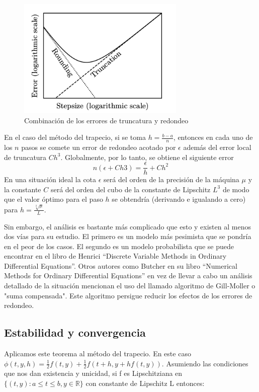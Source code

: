\documentclass{article}
\theoremstyle{theorem-style}  %
\theoremstyle{definition-style}
\theoremstyle{example-style}
\begin{document}
		\begin{figure}[H]
			\centering
			\includegraphics[width=8cm]{./Images/redondeo.png}
			\caption{Combinación de los errores de truncatura y redondeo} 
			\label{fig:redondeo}
		\end{figure}
		
		En el caso del método del trapecio, si se toma $h=\frac{b-a}{n}$, entonces en cada uno de los $n$ pasos se comete un error de redondeo acotado por $\epsilon$ además del error local de truncatura $Ch^{3}$. Globalmente, por lo tanto, se obtiene el siguiente error 
		$$ n(\epsilon+Ch{3})=\frac{\epsilon}{h}+Ch^{2} $$
		En una situación ideal la cota $\epsilon$ será del orden de la precisión de la máquina $\mu$ y la constante $C$ será del orden del cubo de la constante de Lipschitz $L^3$ de modo que el valor óptimo para el paso $h$ se obtendría (derivando e igualando a cero) para $h=\frac{\sqrt[3]\mu}{L}$.
		
		Sin embargo, el análisis es bastante más complicado que esto y existen al menos dos vías para su estudio. El primero es un modelo más pesimista que se pondría en el peor de los casos. El segundo es un modelo probabilista que se puede encontrar en el libro de Henrici ``Discrete Variable Methods in Ordinary Differential Equations''. Otros autores como Butcher en su libro ``Numerical Methods for Ordinary Differential Equations'' en vez de llevar a cabo un análisis detallado de la situación mencionan el uso del llamado algoritmo de Gill-Moller o "suma compensada". Este algoritmo persigue reducir los efectos de los errores de redondeo.\cite{Butcher}

\subsection{Estabilidad y convergencia} \label{sec:trapecio-explicito:estabilidad}

	Aplicamos este teorema al método del trapecio. En este caso $\phi(t,y,h)=\frac{1}{2}f(t,y)+\frac{1}{2}f(t+h,y+hf(t,y))$. Asumiendo las condiciones que nos dan existencia y unicidad, si f es Lipschitziana en 
	$\{(t,y):a \leq t \leq b, y \in \mathbb{R}\}$ 
	con constante de Lipschitz L entonces:
	
\end{document}
